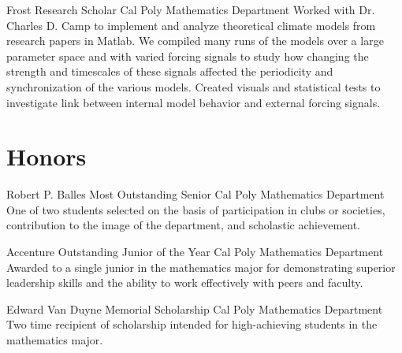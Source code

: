 \documentclass[letterpaper, 11pt, sans]{moderncv}
\begin{document}
        {Frost Research Scholar}
        {Cal Poly Mathematics Department}{}{}
        {
            Worked with Dr. Charles D. Camp to implement and analyze theoretical climate models from research papers in Matlab.
            We compiled many runs of the models over a large parameter space and with varied forcing signals to study how changing the strength and timescales of these signals affected the periodicity and synchronization of the various models.
            Created visuals and statistical tests to investigate link between internal model behavior and external forcing signals.
        }


\newpage
% 

\section{Honors}

        {Robert P. Balles Most Outstanding Senior}
        {Cal Poly Mathematics Department}{}{}
        {One of two students selected on the basis of participation in clubs or societies, contribution to the image of the department, and scholastic achievement.\newline}

        {Accenture Outstanding Junior of the Year}
        {Cal Poly Mathematics Department}{}{}
        {Awarded to a single junior in the mathematics major for demonstrating superior leadership skills and the ability to work effectively with peers and faculty.\newline}

        {Edward Van Duyne Memorial Scholarship}
        {Cal Poly Mathematics Department}{}{}
        {Two time recipient of scholarship intended for high-achieving students in the mathematics major.\newline}
\end{document}
